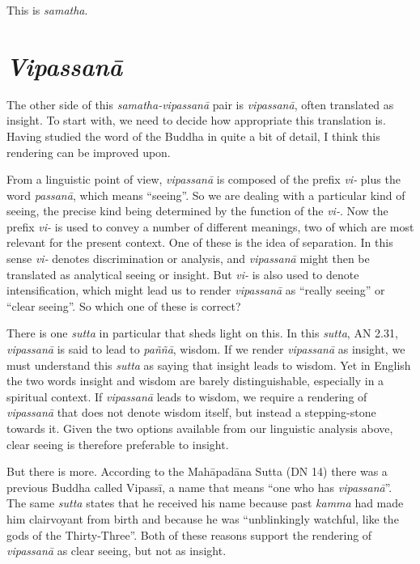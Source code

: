 \documentclass[12pt,openany]{book}
\begin{document}
This is \textit{samatha}.

\section*{\textit{Vipassanā}}

The other side of this \textit{samatha}\textit{-vipassanā} pair is \textit{vipassanā}, often translated as insight. To start with, we need to decide how appropriate this translation is. Having studied the word of the Buddha in quite a bit of detail, I think this rendering can be improved upon.

From a linguistic point of view, \textit{vipassanā} is composed of the prefix \textit{vi-} plus the word \textit{passanā}, which means “seeing”. So we are dealing with a particular kind of seeing, the precise kind being determined by the function of the \textit{vi-}. Now the prefix \textit{vi-} is used to convey a number of different meanings, two of which are most relevant for the present context. One of these is the idea of separation. In this sense \textit{vi-} denotes discrimination or analysis, and \textit{vipassanā} might then be translated as analytical seeing or insight. But \textit{vi-} is also used to denote intensification, which might lead us to render \textit{vipassanā} as “really seeing” or “clear seeing”. So which one of these is correct?

There is one \textit{sutta} in particular that sheds light on this. In this \textit{sutta}, AN 2.31, \textit{vipassanā} is said to lead to \textit{paññā}, wisdom. If we render \textit{vipassanā} as insight, we must understand this \textit{sutta} as saying that insight leads to wisdom. Yet in English the two words insight and wisdom are barely distinguishable, especially in a spiritual context. If \textit{vipassanā} leads to wisdom, we require a rendering of \textit{vipassanā} that does not denote wisdom itself, but instead a stepping-stone towards it. Given the two options available from our linguistic analysis above, clear seeing is therefore preferable to insight.

But there is more. According to the Mahāpadāna Sutta (DN 14) there was a previous Buddha called Vipassī, a name that means “one who has \textit{vipassanā}”. The same \textit{sutta} states that he received his name because past \textit{kamma} had made him clairvoyant from birth and because he was “unblinkingly watchful, like the gods of the Thirty-Three”. Both of these reasons support the rendering of \textit{vipassanā} as clear seeing, but not as insight.
\end{document}
